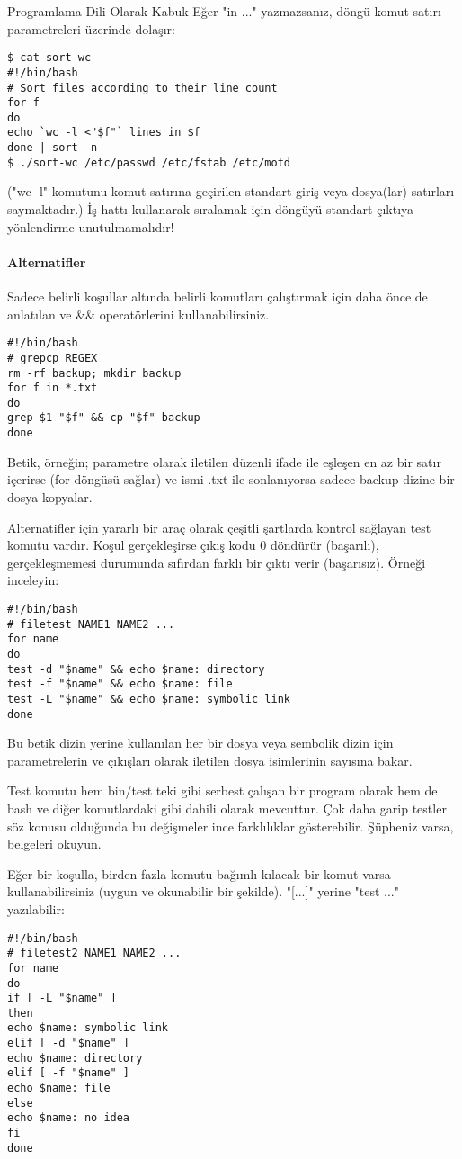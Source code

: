 \begin{section}{Programlama Dili Olarak Kabuk}
Eğer "in ..." yazmazsanız, döngü komut satırı parametreleri üzerinde dolaşır:
\begin{verbatim}
$ cat sort-wc
#!/bin/bash
# Sort files according to their line count
for f
do
echo `wc -l <"$f"` lines in $f
done | sort -n
$ ./sort-wc /etc/passwd /etc/fstab /etc/motd
\end{verbatim}

("wc -l" komutunu komut satırına geçirilen standart giriş veya dosya(lar) satırları saymaktadır.) İş hattı kullanarak sıralamak için döngüyü standart çıktıya yönlendirme unutulmamalıdır!

\paragraph{Alternatifler}{ Sadece belirli koşullar altında belirli komutları çalıştırmak için daha önce de anlatılan \textbar \textbar ve \&\& operatörlerini kullanabilirsiniz.
\begin{verbatim}
#!/bin/bash
# grepcp REGEX
rm -rf backup; mkdir backup
for f in *.txt
do
grep $1 "$f" && cp "$f" backup
done
\end{verbatim}
}

Betik, örneğin; parametre olarak iletilen düzenli ifade ile eşleşen en az bir satır içerirse (for döngüsü sağlar) ve ismi .txt ile sonlanıyorsa sadece backup dizine bir dosya kopyalar.

Alternatifler için yararlı bir araç olarak çeşitli şartlarda kontrol sağlayan test komutu vardır. Koşul gerçekleşirse çıkış kodu 0 döndürür (başarılı), gerçekleşmemesi durumunda sıfırdan farklı bir çıktı verir (başarısız). Örneği inceleyin:
\begin{verbatim}
#!/bin/bash
# filetest NAME1 NAME2 ...
for name
do
test -d "$name" && echo $name: directory
test -f "$name" && echo $name: file
test -L "$name" && echo $name: symbolic link
done
\end{verbatim}

Bu betik dizin yerine kullanılan her bir dosya veya sembolik dizin için parametrelerin ve çıkışları olarak iletilen dosya isimlerinin sayısına bakar.

Test komutu hem bin/test teki gibi serbest çalışan bir program olarak hem de bash ve diğer komutlardaki gibi dahili olarak mevcuttur. Çok daha garip testler söz konusu olduğunda bu değişmeler ince farklılıklar gösterebilir. Şüpheniz varsa, belgeleri okuyun.

Eğer bir koşulla, birden fazla komutu bağımlı kılacak bir komut varsa kullanabilirsiniz (uygun ve okunabilir bir şekilde). "[...]" yerine "test ..." yazılabilir:
\begin{verbatim}
#!/bin/bash
# filetest2 NAME1 NAME2 ...
for name
do
if [ -L "$name" ]
then
echo $name: symbolic link
elif [ -d "$name" ]
echo $name: directory
elif [ -f "$name" ]
echo $name: file
else
echo $name: no idea
fi
done
\end{verbatim}


\end{section}
